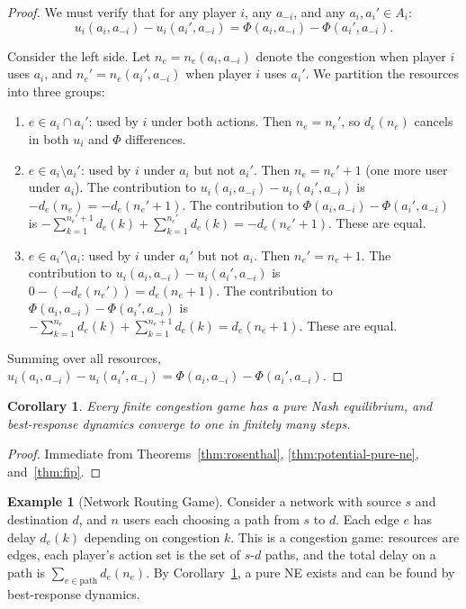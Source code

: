 \documentclass[11pt,a4paper]{article}
\theoremstyle{definition}
\newtheorem{example}{Example}[section]
\theoremstyle{plain}
\newtheorem{corollary}[theorem]{Corollary}
\theoremstyle{remark}
\begin{document}
\begin{proof}
We must verify that for any player $i$, any $a_{-i}$, and any $a_i, a_i' \in A_i$:
\[
    u_i(a_i, a_{-i}) - u_i(a_i', a_{-i}) = \Phi(a_i, a_{-i}) - \Phi(a_i', a_{-i}).
\]

Consider the left side. Let $n_e = n_e(a_i, a_{-i})$ denote the congestion when player $i$
uses $a_i$, and $n_e' = n_e(a_i', a_{-i})$ when player $i$ uses $a_i'$. We partition the
resources into three groups:
\begin{enumerate}[label=(\roman*)]
    \item $e \in a_i \cap a_i'$: used by $i$ under both actions. Then $n_e = n_e'$, so
    $d_e(n_e)$ cancels in both $u_i$ and $\Phi$ differences.
    \item $e \in a_i \setminus a_i'$: used by $i$ under $a_i$ but not $a_i'$. Then
    $n_e = n_e' + 1$ (one more user under $a_i$). The contribution to $u_i(a_i, a_{-i})
    - u_i(a_i', a_{-i})$ is $-d_e(n_e) = -d_e(n_e' + 1)$. The contribution to
    $\Phi(a_i, a_{-i}) - \Phi(a_i', a_{-i})$ is $-\sum_{k=1}^{n_e'+1} d_e(k)
    + \sum_{k=1}^{n_e'} d_e(k) = -d_e(n_e'+1)$. These are equal.
    \item $e \in a_i' \setminus a_i$: used by $i$ under $a_i'$ but not $a_i$. Then
    $n_e' = n_e + 1$. The contribution to $u_i(a_i, a_{-i}) - u_i(a_i', a_{-i})$ is
    $0 - (-d_e(n_e')) = d_e(n_e + 1)$. The contribution to
    $\Phi(a_i, a_{-i}) - \Phi(a_i', a_{-i})$ is $-\sum_{k=1}^{n_e} d_e(k)
    + \sum_{k=1}^{n_e+1} d_e(k) = d_e(n_e+1)$. These are equal.
\end{enumerate}
Summing over all resources, $u_i(a_i, a_{-i}) - u_i(a_i', a_{-i})
= \Phi(a_i, a_{-i}) - \Phi(a_i', a_{-i})$.
\end{proof}

\begin{corollary}
\label{cor:congestion-ne}
Every finite congestion game has a pure Nash equilibrium, and best-response dynamics
converge to one in finitely many steps.
\end{corollary}

\begin{proof}
Immediate from Theorems~\ref{thm:rosenthal}, \ref{thm:potential-pure-ne},
and~\ref{thm:fip}.
\end{proof}

\begin{example}[Network Routing Game]
\label{ex:routing}
Consider a network with source $s$ and destination $d$, and $n$ users each choosing a path
from $s$ to $d$. Each edge $e$ has delay $d_e(k)$ depending on congestion $k$. This is a
congestion game: resources are edges, each player's action set is the set of $s$-$d$ paths,
and the total delay on a path is $\sum_{e \in \text{path}} d_e(n_e)$. By
Corollary~\ref{cor:congestion-ne}, a pure NE exists and can be found by best-response
dynamics.
\end{example}
\end{document}
